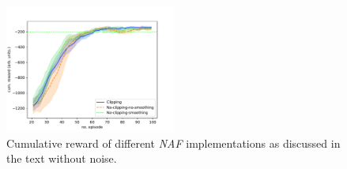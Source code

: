 \documentclass[
reprint,
amsmath,amssymb,amsfonts,clevref,
aps,
prstab,
]{revtex4-2}
\begin{document}
	\begin{figure}[!h]
	\centering
	\includegraphics*[width=0.5\textwidth]{Figures/Comparison_naf}
	\caption{Cumulative reward of different \emph{NAF} implementations as discussed in the text without noise.}
	\label{fig:comparsion_smoothing_small}
\end{figure}
\end{document}
